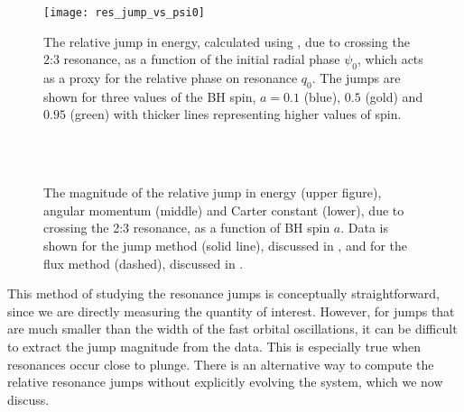 \begin{figure}[htbp]
\centering
\texttt{[image: res\_jump\_vs\_psi0]}
\caption{\label{fig:res-jump-vs-psi0}The relative jump in energy, calculated using , due to crossing the 2:3 resonance, as a function of the initial radial phase $\psi_0$, which acts as a proxy for the relative phase on resonance $q_0$. The jumps are shown for three values of the BH spin, $a = 0.1$ (blue), $0.5$ (gold) and $0.95$ (green) with thicker lines representing higher values of spin.}
\end{figure}

\begin{figure}[htbp]
\centering
{}\\
\\
\caption{\label{fig:res-jump-vs-a}The magnitude of the relative jump in energy (upper figure), angular momentum (middle) and Carter constant (lower), due to crossing the 2:3 resonance, as a function of BH spin $a$. Data is shown for the jump method (solid line), discussed in , and for the flux method (dashed), discussed in .}
\end{figure}

This method of studying the resonance jumps is conceptually straightforward, since we are directly measuring the quantity of interest. However, for jumps that are much smaller than the width of the fast orbital oscillations, it can be difficult to extract the jump magnitude from the data. This is especially true when resonances occur close to plunge. There is an alternative way to compute the relative resonance jumps without explicitly evolving the system, which we now discuss.

